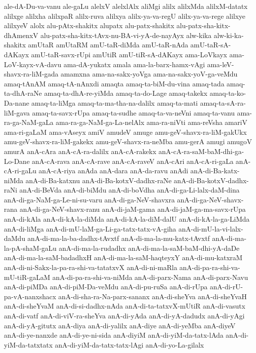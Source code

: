 {ale-dA-Du-va-vanu
ale-gaLu
alelxV
alelxlAlx
aliMgi
alilx
alilxMda
alilxM-datatx
alilxge
alilxha
alilxpaR
alilx-ruva
alilxya
alilx-ya-va-regU
alilx-ya-va-rege
alilxye
alilxyeV
alolx
alu-pAtx-shakitx
alupatx
alu-patx-shakitx
alu-patx-sha-kitx-dhAmenxV
alu-patx-sha-kitx-tAvx-nu-BA-vi-yA-de-nayAyx
alw-kika
alw-ki-ka-shakitx
amUtaR
amUtaRM
amU-taR-diMda
amU-taR-nAda
amU-taR-sA-dAKayx
amU-taR-savx-rUpi
amUtiR
amU-tiR-sA-dAKayx
ama-LoVkayx
ama-LoV-kayx-vA-davu
ama-dA-yukatx
amala
ama-la-barx-hamx-vAgi
ama-leV-shavx-ra-liM-gada
amamxna
ama-na-sakx-yoVga
ama-na-sakx-yoV-ga-veMdu
amaq-tAnAM
amaq-tA-nAnxdi
amaqta
amaq-ta-biM-du-vina
amaq-tada
amaq-ta-dhA-raNe
amaq-ta-dhA-re-yiMda
amaq-ta-do-Lage
amaq-takekx
amaq-ta-ko-Da-nane
amaq-ta-liMga
amaq-ta-ma-tha-na-dalilx
amaq-ta-mati
amaq-ta-sA-ra-liM-gava
amaq-ta-savx-rUpa
amaq-ta-sudhe
amaq-ta-va-neVni
amaq-ta-vanu
ama-ra-ga-NaM-gaLa
ama-ra-ga-NaM-ga-La-nelAlx
ama-ra-niVti
ama-reVsha
amariV
ama-ri-gaLaM
ama-vAseyx
amiV
amudeV
amuge
amu-geV-shavx-ra-liM-gakUkx
amu-geV-shavx-ra-liM-gakekx
amu-geV-shavx-ra-neMba
amu-gerA
amugi
amugoV
amurA
anA-cAra
anA-cA-ra-dalilx
anA-cA-rakekx
anA-cA-ra-saM-baM-dhi-ga-Lo-Dane
anA-cA-rava
anA-cA-rave
anA-cA-raveV
anA-cAri
anA-cA-ri-gaLa
anA-cA-ri-gaLu
anA-cA-riya
anAda
anA-dara
anA-da-ravu
anAdi
anA-di-Ba-katx-niMda
anA-di-Ba-katxnu
anA-di-Ba-kotxV-dadhx-raNe
anA-di-Ba-kotxV-dadhx-raNi
anA-di-BeVda
anA-di-biMdu
anA-di-boVdha
anA-di-ga-Li-lalx-daM-dina
anA-di-ga-NaM-ga-Le-ni-su-varu
anA-di-ga-NeV-shavxra
anA-di-ga-NeV-shavx-rana
anA-di-ga-NeV-shavx-ranu
anA-di-jaM-gama
anA-di-jaM-ga-ma-savx-rUpa
anA-di-kAla
anA-di-kA-la-diMda
anA-di-kA-la-diM-dalU
anA-di-kA-la-ga-LiMda
anA-di-liMga
anA-di-mU-laM-ga-Li-ga-tatx-tatx-vA-giha
anA-di-mU-la-vi-lalx-daMdu
anA-di-ma-la-ba-dadhx-tAvxtf
anA-di-ma-la-mu-katx-tAvxtf
anA-di-ma-la-pA-shaM-gaLu
anA-di-ma-la-rudadhx
anA-di-ma-la-saM-baM-dhi-yA-daDe
anA-di-ma-la-saM-badadhxH
anA-di-ma-la-saM-haqteyxY
anA-di-mu-katxraM
anA-di-ni-Sakx-la-pa-ra-shi-va-tatatxvX
anA-di-ni-maRla
anA-di-pa-ra-shi-va-mU-tiR-gaLaM
anA-di-pa-ra-shi-va-niMda
anA-di-parx-Nama
anA-di-parx-Navu
anA-di-piMDa
anA-di-piM-Da-veMdu
anA-di-pu-ruSa
anA-di-rUpa
anA-di-rU-pa-vA-nanxshacx
anA-di-sha-ra-Na-parx-sananx
anA-di-sheYva
anA-di-sheYvaH
anA-di-sheYvaM
anA-di-si-dadhx-nAda
anA-di-ta-tatxvX-mUtiR
anA-di-vasutx
anA-di-vatf
anA-di-viV-ra-sheYva
anA-di-yAda
anA-di-yA-dadudx
anA-di-yAgi
anA-di-yA-gitutx
anA-diya
anA-di-yalilx
anA-diye
anA-di-yeMba
anA-diyeV
anA-di-ye-nanxde
anA-di-ye-ni-sida
anA-diyiM
anA-di-yiM-da-tatx-lAda
anA-di-yiM-da-tatxtatx
anA-di-yiM-da-tatx-tatx-lAgi
anA-di-yo-La-gilalx
}
